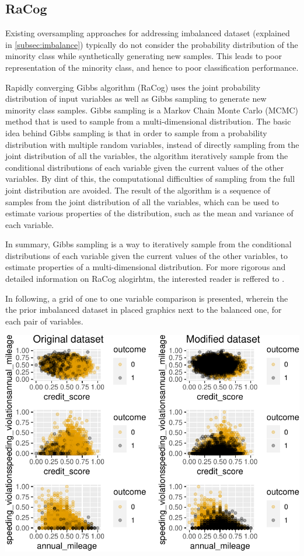 \documentclass{article}
\begin{document}
\hypertarget{racog}{%
\subsection{\texorpdfstring{RaCog
\label{subsec:racog}}{RaCog }}\label{racog}}

Existing oversampling approaches for addressing imbalanced dataset
(explained in \ref{subsec:imbalance}) typically do not consider the
probability distribution of the minority class while synthetically
generating new samples. This leads to poor representation of the
minority class, and hence to poor classification performance.

Rapidly converging Gibbs algorithm (RaCog) uses the joint probability
distribution of input variables as well as Gibbs sampling to generate
new minority class samples. Gibbs sampling is a Markov Chain Monte Carlo
(MCMC) method \cite{bishop} that is used to sample from a
multi-dimensional distribution. The basic idea behind Gibbs sampling is
that in order to sample from a probability distribution with multiple
random variables, instead of directly sampling from the joint
distribution of all the variables, the algorithm iteratively sample from
the conditional distributions of each variable given the current values
of the other variables. By dint of this, the computational difficulties
of sampling from the full joint distribution are avoided. The result of
the algorithm is a sequence of samples from the joint distribution of
all the variables, which can be used to estimate various properties of
the distribution, such as the mean and variance of each variable.

In summary, Gibbs sampling is a way to iteratively sample from the
conditional distributions of each variable given the current values of
the other variables, to estimate properties of a multi-dimensional
distribution. For more rigorous and detailed information on RaCog
alogirhtm, the interested reader is reffered to \cite{racog}.

In following, a grid of one to one variable comparison is presented,
wherein the the prior imbalanced dataset in placed graphics next to the
balanced one, for each pair of variables.

\includegraphics{report_files/figure-latex/unnamed-chunk-8-1.pdf}
\end{document}
